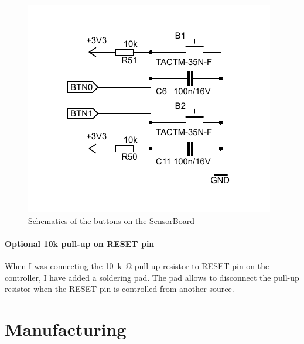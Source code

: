 \begin{figure}
	\centering
	\label{fig:schButton}
	\caption{Schematics of the buttons on the SensorBoard}
	\includegraphics[scale=1.3]{img/SchButtons.pdf}
\end{figure}

\paragraph{Optional 10k pull-up on RESET pin}
When I was connecting the \SI{10}{k\ohm} pull-up resistor to RESET pin on the controller, I have added a soldering pad. The pad allows to disconnect the pull-up resistor when the RESET pin is controlled from another source.

\section{Manufacturing}
\label{HWmanufacturing}

